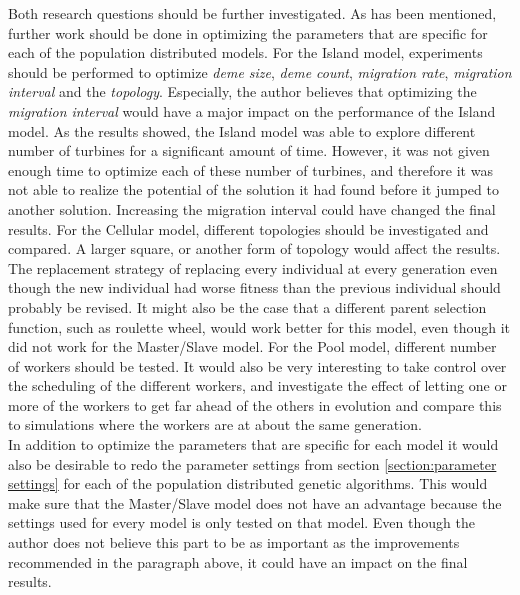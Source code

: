 \noindent Both research questions should be further investigated. As has been mentioned, further work should be done in optimizing the parameters that are specific for each of the population distributed models. For the Island model, experiments should be performed to optimize \textit{deme size}, \textit{deme count}, \textit{migration rate}, \textit{migration interval} and the \textit{topology}. Especially, the author believes that optimizing the \textit{migration interval} would have a major impact on the performance of the Island model. As the results showed, the Island model was able to explore different number of turbines for a significant amount of time. However, it was not given enough time to optimize each of these number of turbines, and therefore it was not able to realize the potential of the solution it had found before it jumped to another solution. Increasing the migration interval could have changed the final results. For the Cellular model, different topologies should be investigated and compared. A larger square, or another form of topology would affect the results. The replacement strategy of replacing every individual at every generation even though the new individual had worse fitness than the previous individual should probably be revised. It might also be the case that a different parent selection function, such as roulette wheel, would work better for this model, even though it did not work for the Master/Slave model. For the Pool model, different number of workers should be tested. It would also be very interesting to take control over the scheduling of the different workers, and investigate the effect of letting one or more of the workers to get far ahead of the others in evolution and compare this to simulations where the workers are at about the same generation. \\


\noindent In addition to optimize the parameters that are specific for each model it would also be desirable to redo the parameter settings from section \ref{section:parameter settings} for each of the population distributed genetic algorithms. This would make sure that the Master/Slave model does not have an advantage because the settings used for every model is only tested on that model. Even though the author does not believe this part to be as important as the improvements  recommended in the paragraph above, it could have an impact on the final results. \\


